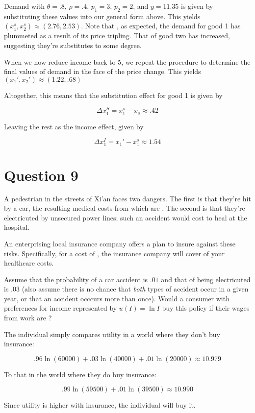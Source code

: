 \documentclass{article}
\newenvironment{solution}{\color{red}}{\color{black}}
\begin{document}
\begin{solution}
Demand with $\theta = .8$, $\rho = .4$, $p_1 = 3$, $p_2 = 2$, and $y = 11.35$ is given by substituting these values into our general form above. This yields $\left( x_1^s, x_2^s \right) \approx (2.76, 2.53)$. Note that , as expected, the demand for good 1 has plummeted as a result of its price tripling. That of good two has increased, suggesting they're substitutes to some degree.

When we now reduce income back to 5, we repeat the procedure to determine the final values of demand in the face of the price change. This yields $(x_1', x_2') \approx (1.22, .68)$

Altogether, this means that the substitution effect for good 1 is given by

\[ \Delta x^S_1 = x^s_1 - x_s \approx .42 \]

Leaving the rest as the income effect, given by

\[ \Delta x^I_1 = x_1' - x^s_1 \approx 1.54 \]

\end{solution}

\section*{Question 9}
A pedestrian in the streets of Xi'an faces two dangers. The first is that they're hit by a car, the resulting medical costs from which are . The second is that they're electricuted by unsecured power lines; such an accident would cost  to heal at the hospital.

An enterprising local insurance company offers a plan to insure against these risks. Specifically, for a cost of , the insurance company will cover  of your healthcare costs.

Assume that the probability of a car accident is $.01$ and that of being electricuted is $.03$ (also assume there is no chance that \textit{both} types of accident occur in a given year, or that an accident occcurs more than once). Would a consumer with preferences for income represented by $u(I) = \ln I$ buy this policy if their wages from work are ?

\begin{solution}
The individual simply compares utility in a world where they don't buy insurance:

\[ .96 \ln(60000) + .03 \ln(40000) + .01 \ln(20000) \approx 10.979 \]

To that in the world where they do buy insurance:

\[ .99 \ln(59500) + .01 \ln(39500) \approx 10.990 \]

Since utility is higher with insurance, the individual will buy it.

\end{solution}
\end{document}
